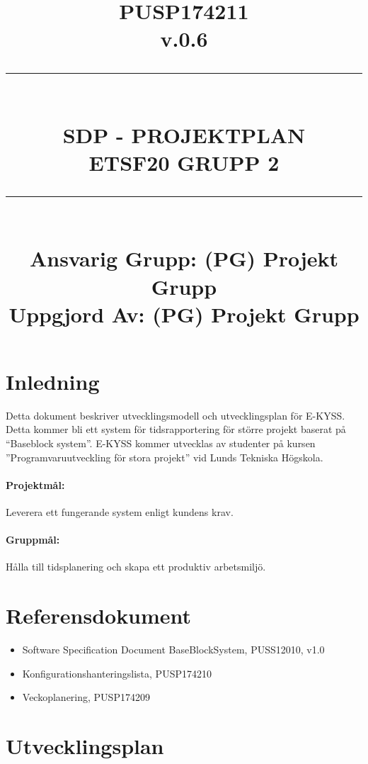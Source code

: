 \documentclass[paper=a4, fontsize=11pt,twoside]{article}
\title{
		\documentNumber{#1}																						
		\documentVersion{#2}																				
		\HRule{0.5pt} \\ %
		\LARGE \textbf{\uppercase{#3}} \\
		\large \textbf{\uppercase{ETSF20 Grupp 2}} 
		\HRule{2pt} \\ [1.5cm]    
		\normalsize            
		\documentResponsible{#4} \\ 
		\documentCreator{#4}  
	}
\newcommand{\HRule}[1]{\rule{\linewidth}{#1}}
\newcommand{\documentNumber}[1]{\centering PUSP1742#1 \\[1.0cm]}
\newcommand{\documentVersion}[1]{\centering \small{v.#1} \\[1.0cm]}
\newcommand{\documentResponsible}[1]{\centering  Ansvarig Grupp: #1}
\newcommand{\documentCreator}[1]{\centering Uppgjord Av: #1}
\newcommand{\grouptitlepage}[4]{ 
	\title{
		\documentNumber{#1}																						
		\documentVersion{#2}																				
		\HRule{0.5pt} \\ %
		\LARGE \textbf{\uppercase{#3}} \\
		\large \textbf{\uppercase{ETSF20 Grupp 2}} 
		\HRule{2pt} \\ [1.5cm]    
		\normalsize            
		\documentResponsible{#4} \\ 
		\documentCreator{#4}  
	}																							
	\maketitle																							
	\thispagestyle{empty} 																					
	\newpage 
}
\begin{document}
\grouptitlepage
{11}
{0.6}
{SDP - Projektplan}
{(PG) Projekt Grupp}	
\tableofcontents
\section{Inledning}
Detta dokument beskriver utvecklingsmodell och utvecklingsplan för E-KYSS. Detta kommer bli ett system för tidsrapportering för större projekt baserat på ``Baseblock system''. E-KYSS kommer utvecklas av studenter på kursen ''Programvaruutveckling för stora projekt'' vid Lunds Tekniska Högskola.
\paragraph{Projektmål:} Leverera ett fungerande system enligt kundens krav.
\paragraph{Gruppmål:} Hålla till tidsplanering och skapa ett produktiv arbetsmiljö.

\section{Referensdokument}
\begin{itemize}
\item Software Specification Document BaseBlockSystem, PUSS12010, v1.0
\item Konfigurationshanteringslista, PUSP174210
\item Veckoplanering, PUSP174209 
\end{itemize}
\section{Utvecklingsplan}
\end{document}

